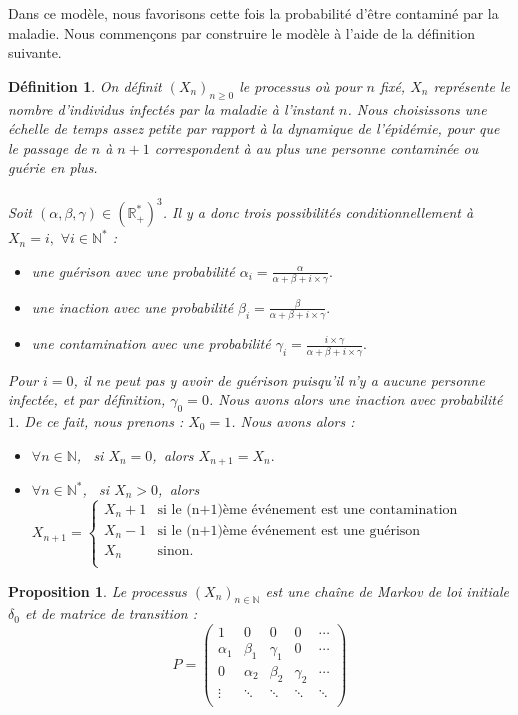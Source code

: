 \documentclass[12pt,a4paper]{report}
\newtheorem{definition}{Définition}[section]
\newtheorem{prop}[thm]{Proposition}
\theoremstyle{remark}
\begin{document}
Dans ce modèle, nous favorisons cette fois la probabilité d'être contaminé par la maladie. Nous commençons par construire le modèle à l'aide de la définition suivante.
\\
\begin{definition}
On définit $(X_n)_{n\geq0}$ le processus où pour $n$ fixé, $X_n$  représente le nombre d'individus infectés par la maladie à l'instant $n$. Nous choisissons une échelle de temps assez petite par rapport à la dynamique de l'épidémie, pour que le passage de $n$ à $n+1$ correspondent à au plus une personne contaminée ou guérie en plus. 
\\
\\
Soit $(\alpha, \beta, \gamma) \in (\mathbb{R}_+^*)^3$. Il y a donc trois possibilités conditionnellement à $X_n = i, \, \, \forall i \in \mathbb{N}^*$ :  
\\
\begin{itemize}
\item une guérison avec une probabilité $\alpha_i=\frac{\alpha}{\alpha+\beta+i \times \gamma}.$
\item une inaction avec une probabilité $\beta_i=\frac{\beta}{\alpha+\beta+i \times \gamma}.$
\item une contamination avec une probabilité $\gamma_i=\frac{i \times \gamma}{\alpha+\beta+i \times \gamma}.$
\end{itemize}
\vspace{0.5cm}
Pour $i=0$, il ne peut pas y avoir de guérison puisqu'il n'y a aucune personne infectée, et par définition, $\gamma_0 = 0$. Nous avons alors une inaction avec probabilité $1$. De ce fait, nous prenons : $X_0 = 1$. Nous avons alors :
\\
\begin{itemize}
\item $\forall n \in \mathbb{N}$, \, si $X_n=0$,\, alors $X_{n+1} = X_n.$
\item $\forall n \in \mathbb{N}^*$, \, si $X_n > 0$,\, alors $X_{n+1} = \left\{
    \begin{array}{ll}
        X_n+1 & \mbox{si le (n+1)ème événement est une contamination} \\
        X_n-1 & \mbox{si le (n+1)ème événement est une guérison} \\
        X_n & \mbox{sinon. }\\
    \end{array}
\right. $
\end{itemize}
\end{definition}
\begin{prop}
Le processus $(X_n)_{n \in \mathbb{N}}$ est une chaîne de Markov de loi initiale $\delta_0$ et de matrice de transition :
$$P=
\begin{pmatrix}
        1 & 0 & 0 & 0 & \cdots \\ 
         \alpha_1 & \beta_1 & \gamma_1 & 0 & \cdots\\
         0 & \alpha_2 & \beta_2 & \gamma_2 & \cdots\\
        \vdots &\ddots & \ddots & \ddots & \ddots \\ 
\end{pmatrix}$$
\end{prop}
\end{document}
